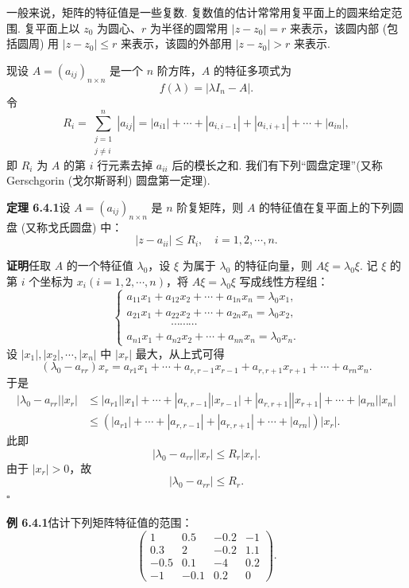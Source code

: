 \documentclass[UTF8, 12pt, fontset=fandol, oneside]{ctexart}
\begin{document}
一般来说，矩阵的特征值是一些复数. 复数值的估计常常用复平面上的圆来给定范围. 复平面上以 $z_0$ 为圆心、$r$ 为半径的圆常用 $|z-z_0|=r$ 来表示，该圆内部 (包括圆周) 用 $|z-z_0|\leq r$ 来表示，该圆的外部用 $|z-z_0|>r$ 来表示.

现设 $A=(a_{ij})_{n\times n}$ 是一个 $n$ 阶方阵，$A$ 的特征多项式为
\[
f(\lambda)=|\lambda I_n-A|.
\]
令
\[
R_i=\sum_{\substack{j=1\\j\neq i}}^n |a_{ij}|=|a_{i1}|+\cdots+|a_{i,i-1}|+|a_{i,i+1}|+\cdots+|a_{in}|,
\]
即 $R_i$ 为 $A$ 的第 $i$ 行元素去掉 $a_{ii}$ 后的模长之和. 我们有下列“圆盘定理”(又称 Gerschgorin (戈尔斯哥利) 圆盘第一定理).

\noindent\textbf{定理 6.4.1}\quad 设 $A=(a_{ij})_{n\times n}$ 是 $n$ 阶复矩阵，则 $A$ 的特征值在复平面上的下列圆盘 (又称戈氏圆盘) 中：
\[
|z-a_{ii}|\leq R_i,\quad i=1,2,\cdots,n.
\]

\noindent\textbf{证明}\quad 任取 $A$ 的一个特征值 $\lambda_0$，设 $\xi$ 为属于 $\lambda_0$ 的特征向量，则 $A\xi=\lambda_0\xi$. 记 $\xi$ 的第 $i$ 个坐标为 $x_i(i=1,2,\cdots,n)$，将 $A\xi=\lambda_0\xi$ 写成线性方程组：
\[
\left\{\begin{array}{l}
a_{11}x_1+a_{12}x_2+\cdots+a_{1n}x_n=\lambda_0x_1,\\
a_{21}x_1+a_{22}x_2+\cdots+a_{2n}x_n=\lambda_0x_2,\\
\qquad\qquad\cdots\cdots\cdots\\
a_{n1}x_1+a_{n2}x_2+\cdots+a_{nn}x_n=\lambda_0x_n.
\end{array}\right.
\]
设 $|x_1|,|x_2|,\cdots,|x_n|$ 中 $|x_r|$ 最大，从上式可得
\[
(\lambda_0-a_{rr})x_r=a_{r1}x_1+\cdots+a_{r,r-1}x_{r-1}+a_{r,r+1}x_{r+1}+\cdots+a_{rn}x_n.
\]
于是
\[
\begin{aligned}
|\lambda_0-a_{rr}||x_r|
&\leq |a_{r1}||x_1|+\cdots+|a_{r,r-1}||x_{r-1}|+|a_{r,r+1}||x_{r+1}|+\cdots+|a_{rn}||x_n|\\
&\leq (|a_{r1}|+\cdots+|a_{r,r-1}|+|a_{r,r+1}|+\cdots+|a_{rn}|)|x_r|.
\end{aligned}
\]
此即
\[
|\lambda_0-a_{rr}||x_r|\leq R_r|x_r|.
\]
由于 $|x_r|>0$，故
\[
|\lambda_0-a_{rr}|\leq R_r.
\]
$\square$

\noindent\textbf{例 6.4.1}\quad 估计下列矩阵特征值的范围：
\[
\left(\begin{array}{rrrr}
1 & 0.5 & -0.2 & -1\\
0.3 & 2 & -0.2 & 1.1\\
-0.5 & 0.1 & -4 & 0.2\\
-1 & -0.1 & 0.2 & 0
\end{array}\right).
\]
\end{document}
